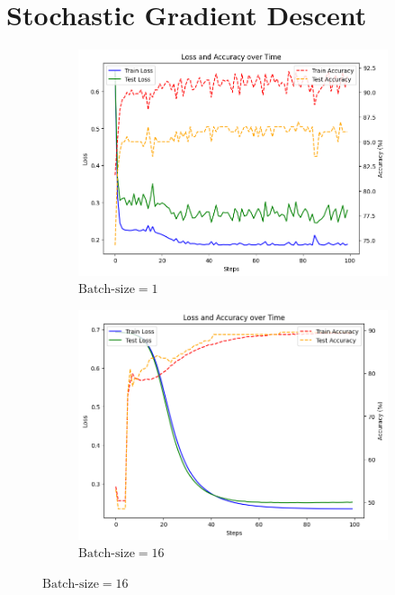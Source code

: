 \documentclass[12pt]{article}
\begin{document}
\section{Stochastic Gradient Descent}

\begin{figure}[tb]
    \centering
    \begin{subfigure}{0.3\textwidth}
        \includegraphics[width=\linewidth]{fig_sec3_exp1.png}
        \caption{$\text{Batch-size}=1$}
    \end{subfigure}
    \begin{subfigure}{0.3\textwidth}
        \includegraphics[width=\linewidth]{fig_sec3_exp2.png}
        \caption{$\text{Batch-size}=16$}
    \end{subfigure}

\end{figure}
\end{document}
